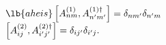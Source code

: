 \begin{equation}
\begin{array}{l}
\lb{aheis}
\left[A_{nm}^{(1)}, A_{n'm'}^{(1)\dag}\right]=\delta_{nm'}\delta_{n'm}\\
\left[A_{ij}^{(2)}, A_{i'j'}^{(2)\dag}\right]=\delta_{ij'}\delta_{i'j}.
\end{array}
\end{equation}

